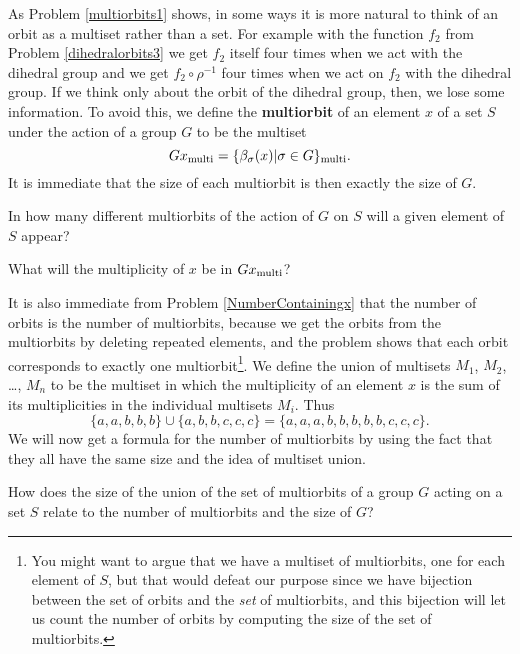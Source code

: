 As Problem \ref{multiorbits1} shows, in some ways it is more natural to
think of an orbit as a multiset rather than a set.  For example with the
function $f_2$ from Problem \ref{dihedralorbits3} we get $f_2$ itself four
times when we act with the dihedral group and we get $f_2\circ\rho^{-1}$
four times when we act on $f_2$ with the dihedral group.  If we think
only about the orbit of the dihedral group, then, we lose some
information.  To avoid this, we define the {\bf multiorbit} of an element
$x$ of a set $S$ under the action of a group $G$ to be the multiset
$$Gx_{\mbox{\scriptsize multi}} = \{\beta_{\sigma}(x)|\sigma \in
G\}_{\mbox{\scriptsize multi}}.$$
It is immediate that the size of each multiorbit is then exactly the size
of
$G$. 

\bp
\iteme In how many different multiorbits of the action of $G$ on $S$ will
a given element of $S$ appear?\label{NumberContainingx}

\iteme What will the multiplicity of $x$ be in
$Gx_{\mbox{\scriptsize multi}}$?
\ep

It is also immediate from Problem \ref{NumberContainingx} that the number
of orbits is the number of multiorbits, because we get the orbits from the
multiorbits by deleting repeated elements, and the problem shows that
each orbit corresponds to exactly one multiorbit\footnote{You might want to
argue that we have a multiset of multiorbits, one for each element of $S$,
 but that would defeat our purpose since
we have  bijection between the set of orbits and the {\em set} of
multiorbits, and this bijection will let us count the number of orbits by
computing the size of the set of multiorbits.}.  We define the union of multisets
$M_1$,
$M_2$,
\ldots,
$M_n$ to be the multiset in which the multiplicity of an element $x$ is
the sum of its multiplicities in the individual multisets $M_i$.  Thus
$$\{a,a,b,b,b\}\cup \{a,b,b,c,c,c\}=\{a,a,a,b,b,b,b,b,c,c,c\}.$$  We will
now get a formula for the number of multiorbits by using the fact that
they all have the same size and the idea of multiset union.

\bp
\iteme How does the size of the union of the set of multiorbits of a group
$G$ acting on a set $S$ relate to the number of multiorbits and the size
of
$G$?\label{numbermultiorbits1}

